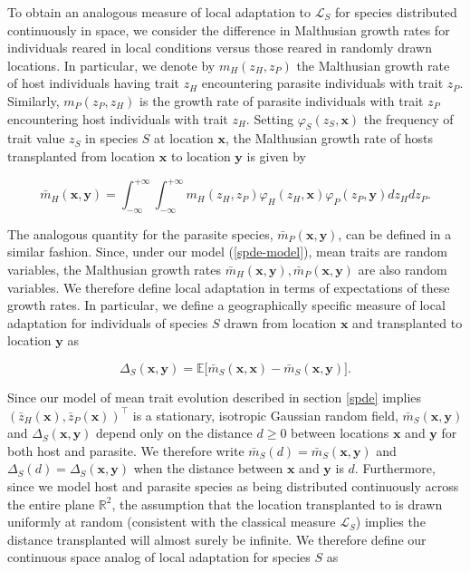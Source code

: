 \documentclass{article}
\begin{document}
To obtain an analogous measure of local adaptation to \(\mathcal L_S\)
for species distributed continuously in space, we consider the
difference in Malthusian growth rates for individuals reared in local
conditions versus those reared in randomly drawn locations. In
particular, we denote by \(m_H(z_H,z_P)\) the Malthusian growth rate of
host individuals having trait \(z_H\) encountering parasite individuals
with trait \(z_P\). Similarly, \(m_P(z_P,z_H)\) is the growth rate of
parasite individuals with trait \(z_P\) encountering host individuals
with trait \(z_H\). Setting \(\varphi_S(z_S,\pmb x)\) the frequency of
trait value \(z_S\) in species \(S\) at location \(\pmb x\), the
Malthusian growth rate of hosts transplanted from location \(\pmb x\) to
location \(\pmb y\) is given by

\begin{equation}
  \bar m_H(\pmb x,\pmb y)=\int_{-\infty}^{+\infty}\int_{-\infty}^{+\infty}m_H(z_H,z_P)\varphi_H(z_H,\pmb x)\varphi_P(z_P,\pmb y)dz_Hdz_P.
\end{equation}

The analogous quantity for the parasite species,
\(\bar m_P(\pmb x,\pmb y)\), can be defined in a similar fashion. Since,
under our model (\ref{spde-model}), mean traits are random variables,
the Malthusian growth rates
\(\bar m_H(\pmb x,\pmb y),\bar m_P(\pmb x,\pmb y)\) are also random
variables. We therefore define local adaptation in terms of expectations
of these growth rates. In particular, we define a geographically
specific measure of local adaptation for individuals of species \(S\)
drawn from location \(\pmb x\) and transplanted to location \(\pmb y\)
as

\begin{equation}
  \Delta_S(\pmb x,\pmb y)=\mathbb E\big[\bar m_S(\pmb x,\pmb x)-\bar m_S(\pmb x,\pmb y)\big].
\end{equation}

Since our model of mean trait evolution described in section \ref{spde}
implies \((\bar z_H(\pmb x),\bar z_P(\pmb x))^\top\) is a stationary,
isotropic Gaussian random field, \(\bar m_S(\pmb x,\pmb y)\) and
\(\Delta_S(\pmb x,\pmb y)\) depend only on the distance \(d\geq0\)
between locations \(\pmb x\) and \(\pmb y\) for both host and parasite.
We therefore write \(\bar m_S(d)=\bar m_S(\pmb x,\pmb y)\) and
\(\Delta_S(d)=\Delta_S(\pmb x,\pmb y)\) when the distance between
\(\pmb x\) and \(\pmb y\) is \(d\). Furthermore, since we model host and
parasite species as being distributed continuously across the entire
plane \(\mathbb R^2\), the assumption that the location transplanted to
is drawn uniformly at random (consistent with the classical measure
\(\mathcal L_S\)) implies the distance transplanted will almost surely
be infinite. We therefore define our continuous space analog of local
adaptation for species \(S\) as
\end{document}
